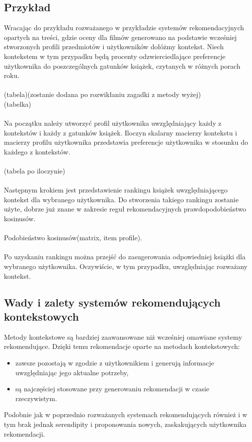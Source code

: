 \documentclass[12pt,a4paper]{report}
\begin{document}
{\subsection{Przykład}
Wracając do przykładu rozważanego w przykładzie systemów rekomendacyjnych opartych na treści, gdzie oceny dla filmów generowano na podstawie wcześniej stworzonych profili przedmiotów i użytkowników dołóżmy kontekst.
Niech kontekstem w tym przypadku będą procenty odzwierciedlające preferencje użytkownika do poszczególnych gatunków książek, czytanych w różnych porach roku.
\\
\\(tabela)(zostanie dodana po rozwikłaniu zagadki z metody wyżej)
\\(tabelka)
\\
\\Na początku należy utworzyć profil użytkownika uwzględniający każdy z kontekstów i każdy z gatunków książek. 
Iloczyn skalarny macierzy kontekstu i macierzy profilu użytkownika przedstawia preferencje użytkownika w stosunku do każdego z kontekstów.
\\
\\(tabela po iloczynie)
\\
\\Następnym krokiem jest przedstawienie rankingu książek uwzględniającego kontekst dla wybranego użytkownika.
Do stworzenia takiego rankingu zostanie użyte, dobrze już znane w zakresie reguł rekomendacyjnych prawdopodobieństwo kosinusów.
\\
\\Podobieństwo kosinusów(matrix, item profile).
\\
\\Po uzyskaniu rankingu można przejść do zasugerowania odpowiedniej książki dla wybranego użytkownika. Oczywiście, w tym przypadku, uwzględniając rozważany kontekst.

\subsection{Wady i zalety systemów rekomendujących kontekstowych}
Metody kontekstowe są bardziej zaawansowane niż wcześniej omawiane systemy rekomendujące. Dzięki temu rekomendacje oparte na metodach kontekstowych:
\begin{itemize}
\item  zawsze pozostają w zgodzie z użytkownikiem i generują informacje uwzględniając jego aktualne potrzeby,
\item  są najczęściej stosowane przy generowaniu rekomendacji w czasie rzeczywistym.
\end{itemize}
Podobnie jak w poprzednio rozważanych systemach rekomendujących również i w tym brak jednak serendipity i proponowania nowych, zaskakujących użytkownika rekomendacji. 
}
\end{document}
